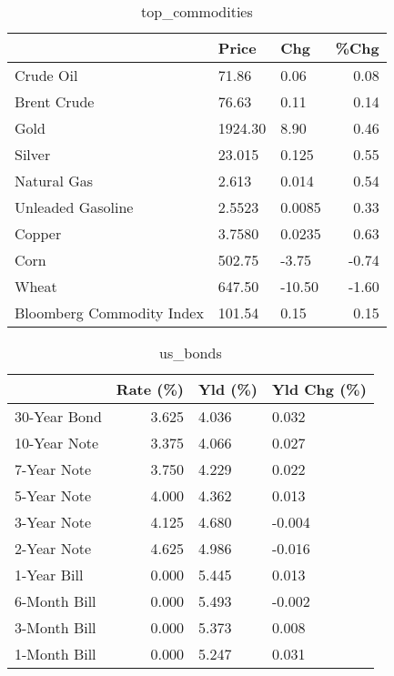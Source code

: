\documentclass{article}%
\begin{document}
\begin{table}[htbp]%
\caption{top\_commodities}%
\centering%
\begin{adjustbox}{width=1\textwidth}%
\begin{tabular}{lllr}
\toprule
                          &   Price &    Chg &  \%Chg \\
\midrule
               Crude Oil  &   71.86 &   0.06 &  0.08 \\
             Brent Crude  &   76.63 &   0.11 &  0.14 \\
                    Gold  & 1924.30 &   8.90 &  0.46 \\
                  Silver  &  23.015 &  0.125 &  0.55 \\
             Natural Gas  &   2.613 &  0.014 &  0.54 \\
       Unleaded Gasoline  &  2.5523 & 0.0085 &  0.33 \\
                  Copper  &  3.7580 & 0.0235 &  0.63 \\
                    Corn  &  502.75 &  -3.75 & -0.74 \\
                   Wheat  &  647.50 & -10.50 & -1.60 \\
Bloomberg Commodity Index &  101.54 &   0.15 &  0.15 \\
\bottomrule
\end{tabular}
%
\end{adjustbox}%
\end{table}

%


\begin{table}[htbp]%
\caption{us\_bonds}%
\centering%
\begin{adjustbox}{width=1\textwidth}%
\begin{tabular}{lrll}
\toprule
             &  Rate (\%) & Yld (\%) & Yld Chg (\%) \\
\midrule
30-Year Bond &     3.625 &   4.036 &       0.032 \\
10-Year Note &     3.375 &   4.066 &       0.027 \\
 7-Year Note &     3.750 &   4.229 &       0.022 \\
 5-Year Note &     4.000 &   4.362 &       0.013 \\
 3-Year Note &     4.125 &   4.680 &      -0.004 \\
 2-Year Note &     4.625 &   4.986 &      -0.016 \\
 1-Year Bill &     0.000 &   5.445 &       0.013 \\
6-Month Bill &     0.000 &   5.493 &      -0.002 \\
3-Month Bill &     0.000 &   5.373 &       0.008 \\
1-Month Bill &     0.000 &   5.247 &       0.031 \\
\bottomrule
\end{tabular}
%
\end{adjustbox}%
\end{table}
\end{document}

